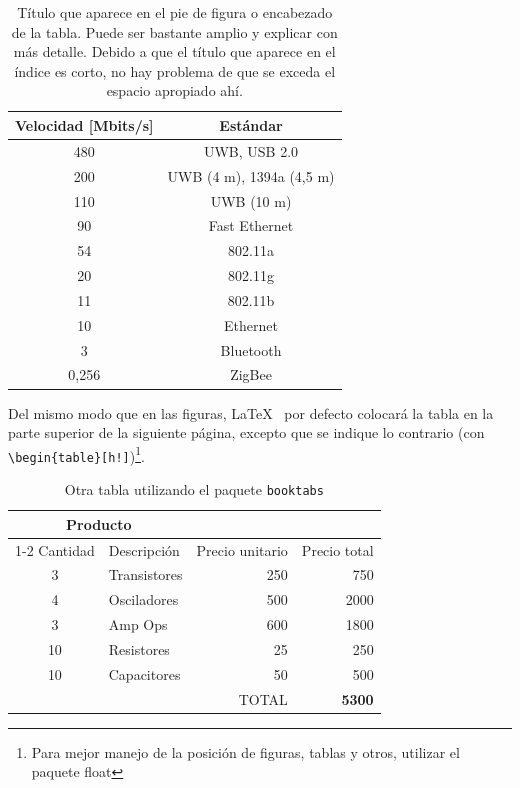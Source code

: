 \documentclass[12pt,letterpaper]{article}
\begin{document}
\begin{table}
\caption[Título en el índice]{Título que aparece en el pie de figura o encabezado de la tabla. Puede ser bastante amplio y explicar con más detalle. Debido a que el título que aparece en el índice es corto, no hay problema de que se exceda el espacio apropiado ahí.}
\label{T:ejemploconlineas}
\begin{center}
\begin{tabular}{| c | c |}
\hline
\textbf{Velocidad [Mbits/s]} & \textbf{Estándar} \\ 
\hline
480 & UWB, USB 2.0 \\ 
200 & UWB (4 m), 1394a (4,5 m) \\
110 & UWB (10 m) \\ 
90 & Fast Ethernet \\ 
54 & 802.11a \\ 
20 & 802.11g \\ 
11 & 802.11b \\ 
10 & Ethernet \\ 
3 & Bluetooth \\ 
0,256 & ZigBee \\ 
\hline
\end{tabular}
\end{center}
\end{table}

Del mismo modo que en las figuras, \LaTeX~ por defecto colocará la tabla en la parte superior de la siguiente página, excepto que se indique lo contrario (con \verb+\begin{table}[h!]+)\footnote{Para mejor manejo de la posición de figuras, tablas y otros, utilizar el paquete \textsf{float}}.

\begin{table}
\caption{Otra tabla utilizando el paquete {\tt booktabs}}
\label{T:otratabla}
\centering
\begin{tabular}{c l r r}
\toprule
\multicolumn{2}{c}{Producto} \\
\cmidrule(r){1-2}
Cantidad & Descripción & Precio unitario & Precio total  \\
\midrule
3  & Transistores 	& 250	& 750	\\
4  & Osciladores   	& 500   & 2000 \\
3  & Amp Ops     	& 600   & 1800	\\
10 & Resistores  	& 25    & 250	\\
10 & Capacitores	& 50 	& 500	\\
\midrule 
\multicolumn{3}{r}{TOTAL} & \textbf{5300} \\
\bottomrule
\end{tabular}
\end{table}
\end{document}
